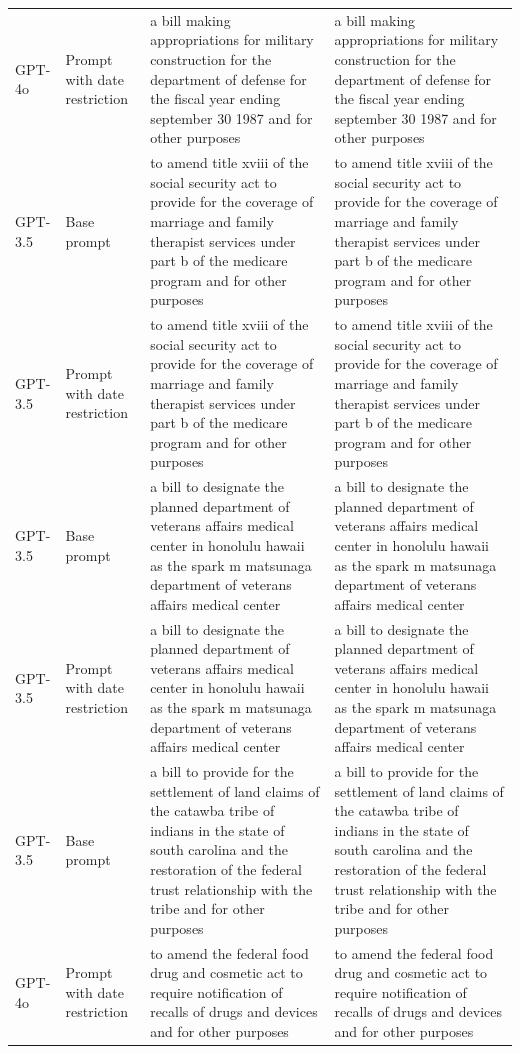 \begin{longtable}{>{\raggedright\arraybackslash}p{1.4cm}>{\raggedright\arraybackslash}p{1.4cm}>{\raggedright\arraybackslash}p{5.5cm}>{\raggedright\arraybackslash}p{5.5cm}}
GPT-4o & Prompt with date restriction & a bill making appropriations for military construction for the department of defense for the fiscal year ending september 30 1987 and for other purposes & a bill making appropriations for military construction for the department of defense for the fiscal year ending september 30 1987 and for other purposes\\
GPT-3.5 & Base prompt & to amend title xviii of the social security act to provide for the coverage of marriage and family therapist services under part b of the medicare program and for other purposes & to amend title xviii of the social security act to provide for the coverage of marriage and family therapist services under part b of the medicare program and for other purposes\\
GPT-3.5 & Prompt with date restriction & to amend title xviii of the social security act to provide for the coverage of marriage and family therapist services under part b of the medicare program and for other purposes & to amend title xviii of the social security act to provide for the coverage of marriage and family therapist services under part b of the medicare program and for other purposes\\
GPT-3.5 & Base prompt & a bill to designate the planned department of veterans affairs medical center in honolulu hawaii as the spark m matsunaga department of veterans affairs medical center & a bill to designate the planned department of veterans affairs medical center in honolulu hawaii as the spark m matsunaga department of veterans affairs medical center\\
GPT-3.5 & Prompt with date restriction & a bill to designate the planned department of veterans affairs medical center in honolulu hawaii as the spark m matsunaga department of veterans affairs medical center & a bill to designate the planned department of veterans affairs medical center in honolulu hawaii as the spark m matsunaga department of veterans affairs medical center\\
GPT-3.5 & Base prompt & a bill to provide for the settlement of land claims of the catawba tribe of indians in the state of south carolina and the restoration of the federal trust relationship with the tribe and for other purposes & a bill to provide for the settlement of land claims of the catawba tribe of indians in the state of south carolina and the restoration of the federal trust relationship with the tribe and for other purposes\\
GPT-4o & Prompt with date restriction & to amend the federal food drug and cosmetic act to require notification of recalls of drugs and devices and for other purposes & to amend the federal food drug and cosmetic act to require notification of recalls of drugs and devices and for other purposes\\

\end{longtable}
